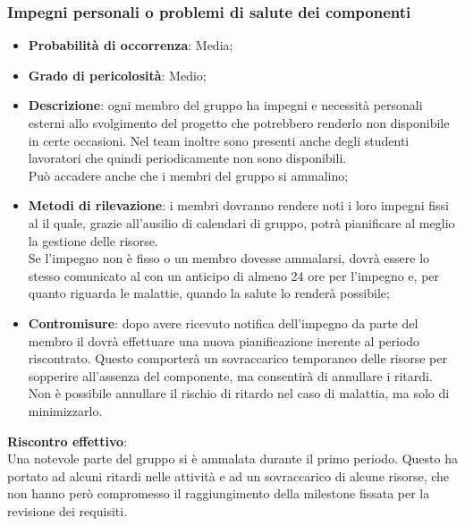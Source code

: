 		\subsubsection{Impegni personali o problemi di salute dei componenti} %
		\label{ssub:impegni_personali_dei_componenti}
			\begin{itemize}
				\item \textbf{Probabilità di occorrenza}: Media;
				\item \textbf{Grado di pericolosità}: Medio;
				\item \textbf{Descrizione}: ogni membro del gruppo ha impegni e necessità personali esterni allo svolgimento del progetto che potrebbero renderlo non disponibile in certe occasioni. Nel team inoltre sono presenti anche degli studenti lavoratori che quindi periodicamente non sono disponibili. \\
				Può accadere anche che i membri del gruppo si ammalino;
				\item \textbf{Metodi di rilevazione}: i membri dovranno rendere noti i loro impegni fissi al \roleProjectManager{} il quale, grazie all'ausilio di calendari di gruppo, potrà pianificare al meglio la gestione delle risorse. \\
				Se l'impegno non è fisso o un membro dovesse ammalarsi, dovrà essere lo stesso comunicato al \roleProjectManager{} con un anticipo di almeno 24 ore per l'impegno e, per quanto riguarda le malattie, quando la salute lo renderà possibile;
				\item \textbf{Contromisure}: dopo avere ricevuto notifica dell'impegno da parte del membro il \roleProjectManager{} dovrà effettuare una nuova pianificazione inerente al periodo riscontrato. Questo comporterà un sovraccarico temporaneo delle risorse per sopperire all'assenza del componente, ma consentirà di annullare i ritardi. \\
				Non è possibile annullare il rischio di ritardo nel caso di malattia, ma solo di minimizzarlo.
			\end{itemize}
		\noindent
		\textbf{Riscontro effettivo}: \\
		Una notevole parte del gruppo si è ammalata durante il primo periodo. Questo ha portato ad alcuni ritardi nelle attività e ad un sovraccarico di alcune risorse, che non hanno però compromesso il raggiungimento della milestone\gloss{} fissata per la revisione dei requisiti.
		
